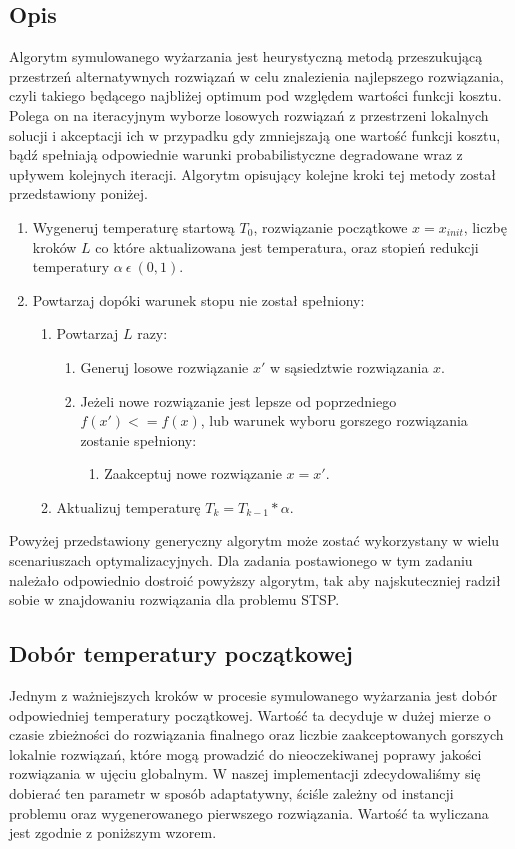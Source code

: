 \subsection{Opis}

Algorytm symulowanego wyżarzania jest heurystyczną metodą przeszukującą przestrzeń alternatywnych rozwiązań w celu znalezienia najlepszego rozwiązania, czyli takiego będącego najbliżej optimum pod względem wartości funkcji kosztu. Polega on na iteracyjnym wyborze losowych rozwiązań z przestrzeni lokalnych solucji i akceptacji ich w przypadku gdy zmniejszają one wartość funkcji kosztu, bądź spełniają odpowiednie warunki probabilistyczne degradowane wraz z upływem kolejnych iteracji. Algorytm opisujący kolejne kroki tej metody został przedstawiony poniżej.

\begin{enumerate}
	\item Wygeneruj temperaturę startową $T_0$, rozwiązanie początkowe $x = x_{init}$, liczbę kroków $L$ co które aktualizowana jest temperatura, oraz stopień redukcji temperatury $\alpha~\epsilon~(0, 1)$.
	\item Powtarzaj dopóki warunek stopu nie został spełniony:
	\begin{enumerate}
		\item Powtarzaj $L$ razy:
		\begin{enumerate}
			\item Generuj losowe rozwiązanie $x'$ w sąsiedztwie rozwiązania $x$.
			\item Jeżeli nowe rozwiązanie jest lepsze od poprzedniego $f(x') <= f(x)$, lub warunek wyboru gorszego rozwiązania zostanie spełniony:
			\begin{enumerate}
				\item Zaakceptuj nowe rozwiązanie $x = x'$.
			\end{enumerate}
		\end{enumerate}
		\item Aktualizuj temperaturę $T_k = T_{k-1} * \alpha$.
	\end{enumerate}
\end{enumerate}

Powyżej przedstawiony generyczny algorytm może zostać wykorzystany w wielu scenariuszach optymalizacyjnych. Dla zadania postawionego w tym zadaniu należało odpowiednio dostroić powyższy algorytm, tak aby najskuteczniej radził sobie w znajdowaniu rozwiązania dla problemu STSP.

\subsection{Dobór temperatury początkowej}
Jednym z ważniejszych kroków w procesie symulowanego wyżarzania jest dobór odpowiedniej temperatury początkowej. Wartość ta decyduje w dużej mierze o czasie zbieżności do rozwiązania finalnego oraz liczbie zaakceptowanych gorszych lokalnie rozwiązań, które mogą prowadzić do nieoczekiwanej poprawy jakości rozwiązania w ujęciu globalnym. W naszej implementacji zdecydowaliśmy się dobierać ten parametr w sposób adaptatywny, ściśle zależny od instancji problemu oraz wygenerowanego pierwszego rozwiązania. Wartość ta wyliczana jest zgodnie z poniższym wzorem.

